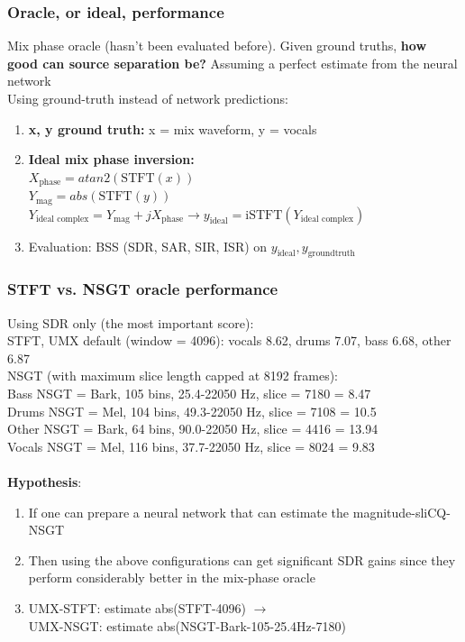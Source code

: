 \documentclass[usenames,dvipsnames]{beamer}
\begin{document}
\begin{frame}
	\frametitle{Oracle, or ideal, performance}
	Mix phase oracle (hasn't been evaluated before). Given ground truths, \textbf{how good can source separation be?} Assuming a perfect estimate from the neural network\\

	Using ground-truth instead of network predictions:
	\begin{enumerate}
		\item
			\textbf{x, y ground truth:} x = mix waveform, y = vocals
		\item
			\textbf{Ideal mix phase inversion:}\\
			\qquad $X_{\text{phase}} = atan2(\text{STFT}(x))$\\
			\qquad $Y_{\text{mag}} = abs(\text{STFT}(y))$\\
			\qquad $Y_{\text{ideal complex}} = Y_{\text{mag}} + j X_{\text{phase}} \rightarrow y_{\text{ideal}} = \text{iSTFT}(Y_{\text{ideal complex}})$
		\item
			Evaluation: BSS (SDR, SAR, SIR, ISR) on $y_{\text{ideal}}, y_{\text{groundtruth}}$
	\end{enumerate}
\end{frame}

\begin{frame}
	\frametitle{STFT vs. NSGT oracle performance}
	Using SDR only (the most important score):\\
	STFT, UMX default (window = 4096): vocals 8.62, drums 7.07, bass 6.68, other 6.87\\

	NSGT (with maximum slice length capped at 8192 frames):\\

	Bass NSGT = Bark, 105 bins, 25.4-22050 Hz, slice = 7180 = 8.47\\
	Drums NSGT = Mel, 104 bins, 49.3-22050 Hz, slice = 7108 = 10.5\\
	Other NSGT = Bark, 64 bins, 90.0-22050 Hz, slice = 4416 = 13.94\\
	Vocals NSGT = Mel, 116 bins, 37.7-22050 Hz, slice = 8024 = 9.83\\\ \\

	\textbf{Hypothesis}:
	\begin{enumerate}
		\item
			If one can prepare a neural network that can estimate the magnitude-sliCQ-NSGT
		\item
			Then using the above configurations can get significant SDR gains since they perform considerably better in the mix-phase oracle
		\item
			UMX-STFT: estimate abs(STFT-4096) $\rightarrow$ \\
			\qquad UMX-NSGT: estimate abs(NSGT-Bark-105-25.4Hz-7180)
	\end{enumerate}
\end{frame}
\end{document}
